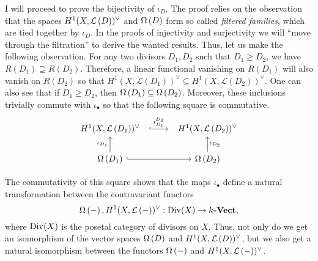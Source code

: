 I will proceed to prove the bijectivity of $\iota_{D}$. The proof relies
on the observation that the spaces $H^1(X,\mathcal{L}\left(D\right))^{\vee}$ and $\Omega\left(D\right)$ form so called
\emph{filtered families}, which are tied together by $\iota_{D}$. In the
proofs of injectivity and surjectivity we will ``move through the
filtration'' to derive the wanted results. Thus, let us make the following
observation. For any two divisors $D_{1}, D_{2}$ such that $D_{1}\geq D_{2}$,
we have $R(D_{1})\supseteq R(D_{2})$. Therefore, a linear functional
vanishing on $R(D_{1})$ will also vanish on $R(D_{2})$ so that
$H^{1}(X,\mathcal{L}(D_{1}))^{\vee}\subseteq H^{1}(X,\mathcal{L}(D_{2}))^\vee$.
One can also see that if $D_{1}\geq D_{2}$, then $\Omega\left(D_{1}\right)
\subseteq\Omega\left(D_{2}\right)$. Moreover, these inclusions trivially
commute with $\iota_{\bullet}$ so that the following square is commutative.
\begin{equation}\label{eq:iota_square}
  \begin{tikzcd}[column sep=large]
    \dual{D_{1}}\rar[hook, shorten=.7em, "i_{D_{1}}^{D_{2}}"] & \dual{D_{2}} \\
    \diffs{D_{1}}\uar{\iota_{D_{1}}}\rar[hook]
    & \diffs{D_{2}}\uar["\iota_{D_{2}}"']
  \end{tikzcd}
\end{equation}
\begin{cat}
  The commutativity of this square shows that the maps $\iota_{\bullet}$
  define a natural transformation between the contravariant functors
  \[
    \Omega\left(-\right),H^1(X,\mathcal{L}\left(-\right))^{\vee}:\operatorname{Div}(X)\to k\textbf{-Vect},
  \]
  where $\operatorname{Div}(X)$ is the posetal category of divisors on $X$.
  Thus, not only do we get an isomorphism of the vector spaces
  $\Omega\left(D\right)$ and $H^1(X,\mathcal{L}\left(D\right))^{\vee}$, but we also get a natural isomorphism
  between the functors $\Omega\left(-\right)$ and $H^1(X,\mathcal{L}\left(-\right))^{\vee}$.
\end{cat}

